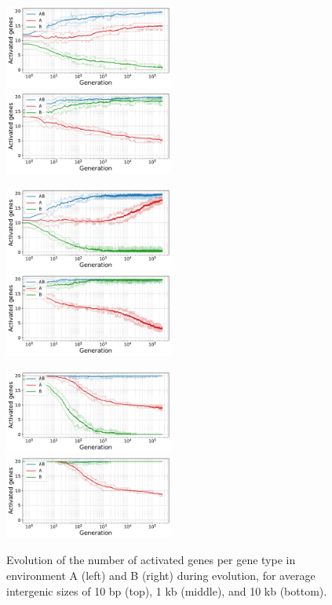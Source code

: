 \begin{figure}[H]
\centering
\includegraphics[width=0.495\textwidth]{param/mean-intergene/inter-0.01k/gene_activity_env_A.pdf}
\includegraphics[width=0.495\textwidth]{param/mean-intergene/inter-0.01k/gene_activity_env_B.pdf}

\includegraphics[width=0.495\textwidth]{param/mean-intergene/inter-1k/gene_activity_env_A.pdf}
\includegraphics[width=0.495\textwidth]{param/mean-intergene/inter-1k/gene_activity_env_B.pdf}

\includegraphics[width=0.495\textwidth]{param/mean-intergene/inter-10k/gene_activity_env_A.pdf}
\includegraphics[width=0.495\textwidth]{param/mean-intergene/inter-10k/gene_activity_env_B.pdf}
\caption[Evolution of the number of activated genes in each environment, with increasing mean intergenic distances]{Evolution of the number of activated genes per gene type in environment A (left) and B (right) during evolution, for average intergenic sizes of 10 bp (top), 1 kb (middle), and 10 kb (bottom).}
\label{fig:param:mean-intergene-activity-by-env}
\end{figure}

